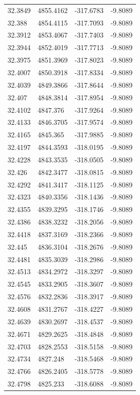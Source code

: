 \begin{table}[H]
\begin{tabular}{llll}
32.3849 & 4855.4162 & -317.6783 & -9.8089 \\
32.388 & 4854.4115 & -317.7093 & -9.8089 \\
32.3912 & 4853.4067 & -317.7403 & -9.8089 \\
32.3944 & 4852.4019 & -317.7713 & -9.8089 \\
32.3975 & 4851.3969 & -317.8023 & -9.8089 \\
32.4007 & 4850.3918 & -317.8334 & -9.8089 \\
32.4039 & 4849.3866 & -317.8644 & -9.8089 \\
32.407 & 4848.3814 & -317.8954 & -9.8089 \\
32.4102 & 4847.376 & -317.9264 & -9.8089 \\
32.4133 & 4846.3705 & -317.9574 & -9.8089 \\
32.4165 & 4845.365 & -317.9885 & -9.8089 \\
32.4197 & 4844.3593 & -318.0195 & -9.8089 \\
32.4228 & 4843.3535 & -318.0505 & -9.8089 \\
32.426 & 4842.3477 & -318.0815 & -9.8089 \\
32.4292 & 4841.3417 & -318.1125 & -9.8089 \\
32.4323 & 4840.3356 & -318.1436 & -9.8089 \\
32.4355 & 4839.3295 & -318.1746 & -9.8089 \\
32.4386 & 4838.3232 & -318.2056 & -9.8089 \\
32.4418 & 4837.3169 & -318.2366 & -9.8089 \\
32.445 & 4836.3104 & -318.2676 & -9.8089 \\
32.4481 & 4835.3039 & -318.2986 & -9.8089 \\
32.4513 & 4834.2972 & -318.3297 & -9.8089 \\
32.4545 & 4833.2905 & -318.3607 & -9.8089 \\
32.4576 & 4832.2836 & -318.3917 & -9.8089 \\
32.4608 & 4831.2767 & -318.4227 & -9.8089 \\
32.4639 & 4830.2697 & -318.4537 & -9.8089 \\
32.4671 & 4829.2625 & -318.4848 & -9.8089 \\
32.4703 & 4828.2553 & -318.5158 & -9.8089 \\
32.4734 & 4827.248 & -318.5468 & -9.8089 \\
32.4766 & 4826.2405 & -318.5778 & -9.8089 \\
32.4798 & 4825.233 & -318.6088 & -9.8089 \\

\end{tabular}
\end{table}
